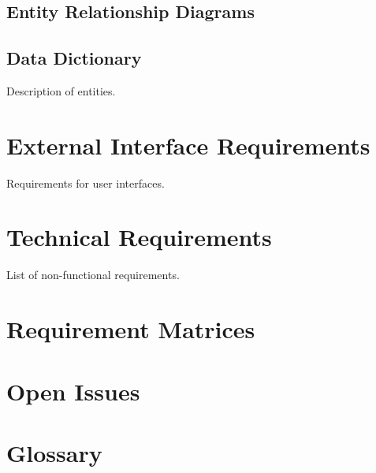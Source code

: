 \documentclass[12pt]{article}
\begin{document}
\clearpage

\subsection{Entity Relationship Diagrams}

\subsection{Data Dictionary}
Description of entities.

\section{External Interface Requirements}
Requirements for user interfaces.

\section{Technical Requirements}
List of non-functional requirements.

\section{Requirement Matrices}

\section{Open Issues}

\section{Glossary}
\end{document}
